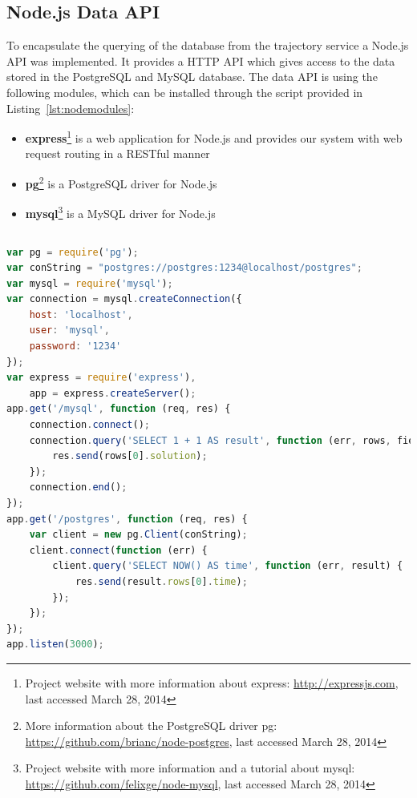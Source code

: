 \documentclass[master,english]{hgbthesis}
\begin{document}
\subsection{Node.js Data API}
To encapsulate the querying of the database from the trajectory service a Node.js API was implemented. It provides a HTTP API which gives access to the data stored in the PostgreSQL and MySQL database. The data API is using the following modules, which can be installed through the script provided in Listing~\ref{lst:nodemodules}:
\begin{itemize}
\item \textbf{express}\footnote{Project website with more information about express: \url{http://expressjs.com}, last accessed March 28, 2014} is a web application for Node.js and provides our system with web request routing in a RESTful manner
\item \textbf{pg}\footnote{More information about the PostgreSQL driver pg: \url{https://github.com/brianc/node-postgres}, last accessed March 28, 2014} is a PostgreSQL driver for Node.js
\item \textbf{mysql}\footnote{Project website with more information and a tutorial about mysql: \url{https://github.com/felixge/node-mysql}, last accessed March 28, 2014} is a MySQL driver for Node.js
\end{itemize}
\begin{lstlisting}[style=BashInputStyle,caption={Script to install the used Node.js modules},label={lst:nodemodules}]
\end{lstlisting}
\begin{lstlisting}[style=htmlcssjs,language=JavaScript,caption={Example for a Node.js app which is using the express framework and the PostgreSQL and MySQL module},label={lst:nodeexpress}]
var pg = require('pg');
var conString = "postgres://postgres:1234@localhost/postgres";
var mysql = require('mysql');
var connection = mysql.createConnection({
    host: 'localhost',
    user: 'mysql',
    password: '1234'
});
var express = require('express'),
    app = express.createServer();
app.get('/mysql', function (req, res) {
    connection.connect();
    connection.query('SELECT 1 + 1 AS result', function (err, rows, fields) {
        res.send(rows[0].solution);
    });
    connection.end();
});
app.get('/postgres', function (req, res) {
    var client = new pg.Client(conString);
    client.connect(function (err) {
        client.query('SELECT NOW() AS time', function (err, result) {
            res.send(result.rows[0].time);
        });
    });
});
app.listen(3000);
\end{lstlisting}
\end{document}
